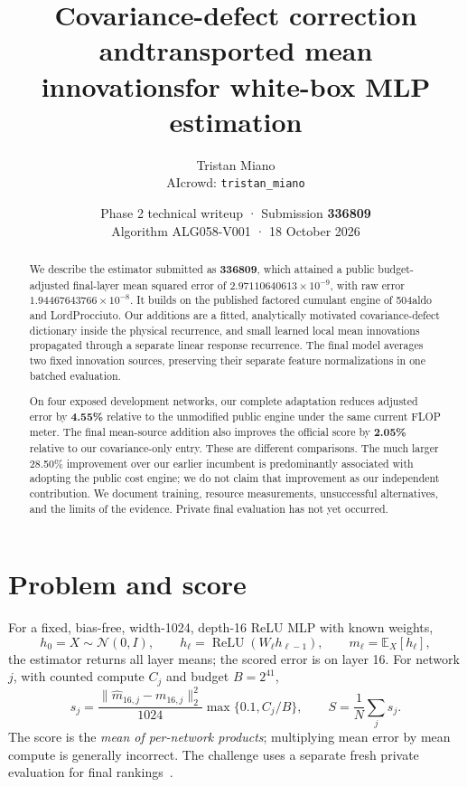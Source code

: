 \documentclass[10pt]{article}
\title{\vspace{-1.5em}\color{ink}\sffamily Covariance-defect correction and\newline transported mean innovations\newline for white-box MLP estimation}
\author{Tristan Miano\\\small AIcrowd: \texttt{tristan\_miano}}
\date{Phase 2 technical writeup · Submission \textbf{336809}\\
\small Algorithm ALG058-V001 · 18 October 2026}
\newcommand{\E}{\mathbb E}
\newcommand{\ReLU}{\operatorname{ReLU}}
\begin{document}
\maketitle\thispagestyle{fancy}
\begin{abstract}
We describe the estimator submitted as \textbf{336809}, which attained a public
budget-adjusted final-layer mean squared error of
\(2.97110640613\times10^{-9}\), with raw error
\(1.94467643766\times10^{-8}\). It builds on the published factored cumulant
engine of 504aldo and LordProcciuto. Our additions are a fitted, analytically
motivated covariance-defect dictionary inside the physical recurrence, and
small learned local mean innovations propagated through a separate linear
response recurrence. The final model averages two fixed innovation sources,
preserving their separate feature normalizations in one batched evaluation.

On four exposed development networks, our complete adaptation reduces
adjusted error by \textbf{4.55\%} relative to the unmodified public engine under
the same current FLOP meter. The final mean-source addition also improves the
official score by \textbf{2.05\%} relative to our covariance-only entry. These
are different comparisons. The much larger 28.50\% improvement over our earlier
incumbent is predominantly associated with adopting the public cost engine;
we do not claim that improvement as our independent contribution. We document
training, resource measurements, unsuccessful alternatives, and the limits of
the evidence. Private final evaluation has not yet occurred.
\end{abstract}

\section{Problem and score}
For a fixed, bias-free, width-1024, depth-16 ReLU MLP with known weights,
\begin{equation}
 h_0=X\sim\mathcal N(0,I),\qquad h_\ell=\ReLU(W_\ell h_{\ell-1}),
 \qquad m_\ell=\E_X[h_\ell],
\end{equation}
the estimator returns all layer means; the scored error is on layer 16.
For network \(j\), with counted compute \(C_j\) and budget \(B=2^{41}\),
\begin{equation}\label{eq:score}
 s_j=\frac{\|\widehat m_{16,j}-m_{16,j}\|_2^2}{1024}
       \max\{0.1,C_j/B\},\qquad S=\frac1N\sum_j s_j.
\end{equation}
The score is the \emph{mean of per-network products}; multiplying mean error
by mean compute is generally incorrect. The challenge uses a separate fresh
private evaluation for final rankings~\cite{rules,update}.
\end{document}
